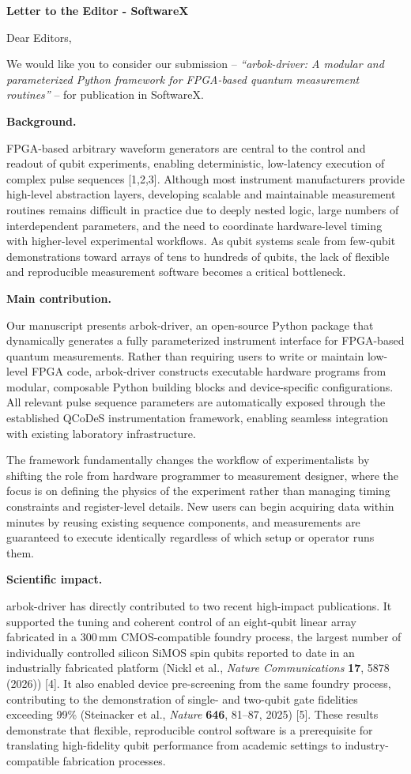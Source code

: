 \documentclass[11pt]{letter}
\newcommand{\separator}{%
  \par\vspace{0.1em}
  \noindent\rule{\textwidth}{0.2pt}
  \vspace{0.1em}
}
\newcommand{\heading}[1]{\par\medskip\noindent\textbf{#1}\quad\ignorespaces}
\begin{document}
\begin{letter}{\textbf{Letter to the Editor - SoftwareX}}

\opening{Dear Editors,}

We would like you to consider our submission -- \emph{``arbok-driver: A modular and parameterized Python framework for FPGA-based quantum measurement routines''} -- for publication in SoftwareX.
\heading{Background.}

FPGA-based arbitrary waveform generators are central to the control and readout of qubit experiments, enabling deterministic, low-latency execution of complex pulse sequences [1,2,3]. Although most instrument manufacturers provide high-level abstraction layers, developing scalable and maintainable measurement routines remains difficult in practice due to deeply nested logic, large numbers of interdependent parameters, and the need to coordinate hardware-level timing with higher-level experimental workflows. As qubit systems scale from few-qubit demonstrations toward arrays of tens to hundreds of qubits, the lack of flexible and reproducible measurement software becomes a critical bottleneck.

\heading{Main contribution.}

Our manuscript presents arbok-driver, an open-source Python package that dynamically generates a fully parameterized instrument interface for FPGA-based quantum measurements. Rather than requiring users to write or maintain low-level FPGA code, arbok-driver constructs executable hardware programs from modular, composable Python building blocks and device-specific configurations. All relevant pulse sequence parameters are automatically exposed through the established QCoDeS instrumentation framework, enabling seamless integration with existing laboratory infrastructure.

The framework fundamentally changes the workflow of experimentalists by shifting the role from hardware programmer to measurement designer, where the focus is on defining the physics of the experiment rather than managing timing constraints and register-level details. New users can begin acquiring data within minutes by reusing existing sequence components, and measurements are guaranteed to execute identically regardless of which setup or operator runs them.

\heading{Scientific impact.}

arbok-driver has directly contributed to two recent high-impact publications.
It supported the tuning and coherent control of an eight-qubit linear array fabricated in a 300\,mm CMOS-compatible foundry process, the largest number of individually controlled silicon SiMOS spin qubits reported to date in an industrially fabricated platform (Nickl et al., \emph{Nature Communications} \textbf{17}, 5878 (2026)) [4].
It also enabled device pre-screening from the same foundry process, contributing to the demonstration of single- and two-qubit gate fidelities exceeding 99\% (Steinacker et al., \emph{Nature} \textbf{646}, 81--87, 2025) [5].
These results demonstrate that flexible, reproducible control software is a prerequisite for translating high-fidelity qubit performance from academic settings to industry-compatible fabrication processes.


\end{letter}
\end{document}
